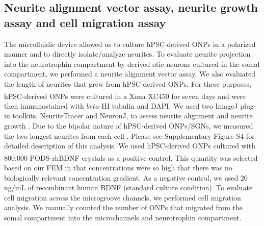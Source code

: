 \documentclass[review]{elsarticle}
\begin{document}
\subsection{Neurite alignment vector assay, neurite growth assay and cell migration assay}
The microfluidic device allowed us to culture hPSC-derived ONPs in a polarized manner and to directly isolate/analyze neurites. To evaluate neurite projection into the neurotrophin compartment by derived otic neurons cultured in the somal compartment, we performed a neurite alignment vector assay. We also evaluated the length of neurites that grew from hPSC-derived ONPs. For these purposes, hPSC-derived ONPs were cultured in a Xona\textsuperscript{\texttrademark} XC450 for seven days and were then immunostained with $beta$-III tubulin and DAPI. We used two ImageJ plug-in toolkits, NeuriteTracer and NeuronJ, to assess neurite alignment and neurite growth \cite{Pool2008, Meijering2004}. Due to the bipolar nature of hPSC-derived ONPs/SGNs, we measured the two longest neurites from each cell \cite{Matsuoka2017,Anniko1995}. Please see Supplementary Figure S4 for detailed description of this analysis. We used hPSC-derived ONPs cultured with 800,000 PODS\textsuperscript{\textregistered}-rhBDNF crystals as a positive control. This quantity was selected based on our FEM in that concentrations were so high that there was no biologically relevant concentration gradient. As a negative control, we used 20 ng/mL of recombinant human BDNF (standard culture condition). To evaluate cell migration across the microgroove channels, we performed cell migration analysis. We manually counted the number of ONPs that migrated from the somal compartment into the microchannels and neurotrophin compartment. 
\end{document}
